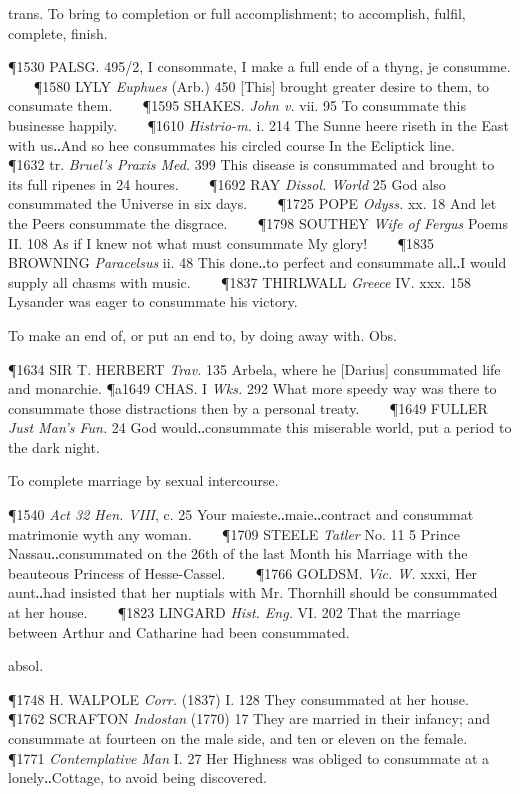 \begin{description}[wide, labelwidth=!, labelindent=0pt]
\begin{myenumerate}

 trans. To bring to completion or full accomplishment; to accomplish, fulfil, complete, finish.

\P 1530 PALSG.  495/2, I consommate, I make a full ende of a thyng, je consumme.    
\P 1580 LYLY  \textit{Euphues} (Arb.) 450 [This] brought greater desire to them, to consumate them.    
\P 1595 SHAKES.  \textit{John v.} vii. 95 To consummate this businesse happily.    
\P 1610 \textit{Histrio-m.}  i. 214 The Sunne heere riseth in the East with us‥And so hee consummates his circled course In the Ecliptick line.    
\P 1632 tr.  \textit{Bruel's Praxis Med.} 399 This disease is consummated and brought to its full ripenes in 24 houres.    
\P 1692 RAY  \textit{Dissol. World} 25 God also consummated the Universe in six days.    
\P 1725 POPE  \textit{Odyss.} xx. 18 And let the Peers consummate the disgrace.    
\P 1798 SOUTHEY  \textit{Wife of Fergus} Poems II. 108 As if I knew not what must consummate My glory!    
\P 1835 BROWNING  \textit{Paracelsus} ii. 48 This done‥to perfect and consummate all‥I would supply all chasms with music.    
\P 1837 THIRLWALL  \textit{Greece} IV. xxx. 158 Lysander was eager to consummate his victory.

 To make an end of, or put an end to, by doing away with. Obs.

\P 1634 SIR T. HERBERT  \textit{Trav.} 135 Arbela, where he [Darius] consummated life and monarchie.
\P a1649 CHAS. I \textit{Wks.} 292 What more speedy way was there to consummate those distractions then by a personal treaty.    
\P 1649 FULLER  \textit{Just Man's Fun.} 24 God would‥consummate this miserable world, put a period to the dark night.

 To complete marriage by sexual intercourse.

\P 1540  \textit{Act 32 Hen. VIII}, c. 25 Your maieste‥maie‥contract and consummat matrimonie wyth any woman.    
\P 1709 STEELE  \textit{Tatler} No. 11 5 Prince Nassau‥consummated on the 26th of the last Month his Marriage with the beauteous Princess of Hesse-Cassel.    
\P 1766 GOLDSM.  \textit{Vic. W.} xxxi, Her aunt‥had insisted that her nuptials with Mr. Thornhill should be consummated at her house.    
\P 1823 LINGARD  \textit{Hist. Eng.} VI. 202 That the marriage between Arthur and Catharine had been consummated.

 absol.

\P 1748 H. WALPOLE  \textit{Corr.} (1837) I. 128 They consummated at her house.    
\P 1762 SCRAFTON  \textit{Indostan} (1770) 17 They are married in their infancy; and consummate at fourteen on the male side, and ten or eleven on the female.    
\P 1771 \textit{Contemplative  Man} I. 27 Her Highness was obliged to consummate at a lonely‥Cottage, to avoid being discovered.


\end{myenumerate}
\end{description}
